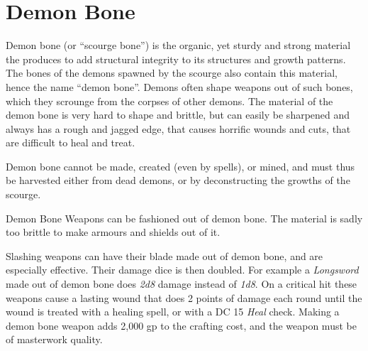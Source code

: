 \section{Demon Bone}
\label{sec:Demon Bone}

Demon bone (or ``scourge bone'') is the organic, yet sturdy and strong
material the  produces to add structural integrity to its
structures and growth patterns. The bones of the demons spawned by the scourge
also contain this material, hence the name ``demon bone''. Demons often shape
weapons out of such bones, which they scrounge from the corpses of other
demons. The material of the demon bone is very hard to shape and brittle, but
can easily be sharpened and always has a rough and jagged edge, that causes
horrific wounds and cuts, that are difficult to heal and treat.

Demon bone cannot be made, created (even by spells), or mined, and must thus
be harvested either from dead demons, or by deconstructing the growths of the
scourge.

\begin{35e}{Demon Bone}
  Weapons can be fashioned out of demon bone. The material is sadly too brittle
  to make armours and shields out of it.

  Slashing weapons can have their blade made out of demon bone, and are
  especially effective. Their damage dice is then doubled. For example a
  \emph{Longsword} made out of demon bone does \emph{2d8} damage instead of
  \emph{1d8}. On a critical hit these weapons cause a lasting wound that does
  2 points of damage each round until the wound is treated with a healing
  spell, or with a DC 15 \emph{Heal} check. Making a demon bone weapon adds
  2,000 gp to the crafting cost, and the weapon must be of masterwork quality.
\end{35e}
